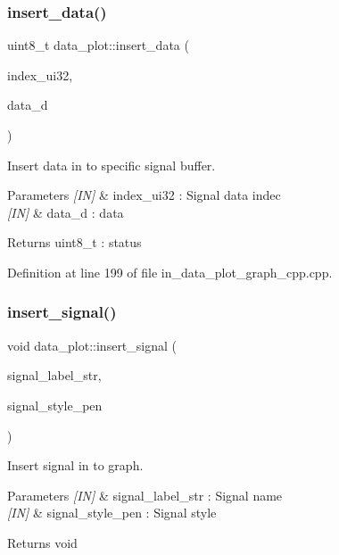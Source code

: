 \subsubsection{insert\_data()}
{\footnotesize\ttfamily uint8\+\_\+t data\+\_\+plot\+::insert\+\_\+data (\begin{DoxyParamCaption}\item[{uint32\+\_\+t}]{index\+\_\+ui32,  }\item[{double}]{data\+\_\+d }\end{DoxyParamCaption})}



Insert data in to specific signal buffer. 


\begin{DoxyParams}{Parameters}
{\em \mbox{[}\+I\+N\mbox{]}} & index\+\_\+ui32 \+: Signal data indec \\
\hline
{\em \mbox{[}\+I\+N\mbox{]}} & data\+\_\+d \+: data \\
\hline
\end{DoxyParams}
\begin{DoxyReturn}{Returns}
uint8\+\_\+t \+: status 
\end{DoxyReturn}


Definition at line 199 of file in\+\_\+data\+\_\+plot\+\_\+graph\+\_\+cpp.\+cpp.

\mbox{\label{group___data__plot_ga901fca7a6dd52ae1c56ba4e09bb4b403}} 
\subsubsection{insert\_signal()}
{\footnotesize\ttfamily void data\+\_\+plot\+::insert\+\_\+signal (\begin{DoxyParamCaption}\item[{wx\+String}]{signal\+\_\+label\+\_\+str,  }\item[{wx\+Pen}]{signal\+\_\+style\+\_\+pen }\end{DoxyParamCaption})}



Insert signal in to graph. 


\begin{DoxyParams}{Parameters}
{\em \mbox{[}\+I\+N\mbox{]}} & signal\+\_\+label\+\_\+str \+: Signal name \\
\hline
{\em \mbox{[}\+I\+N\mbox{]}} & signal\+\_\+style\+\_\+pen \+: Signal style \\
\hline
\end{DoxyParams}
\begin{DoxyReturn}{Returns}
void 
\end{DoxyReturn}



